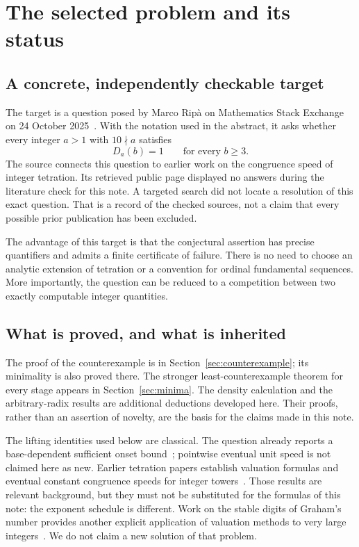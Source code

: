 \documentclass[11pt,a4paper]{article}
\theoremstyle{definition}
\begin{document}
\section{The selected problem and its status}\label{sec:status}

\subsection{A concrete, independently checkable target}
The target is a question posed by Marco Rip\`a on Mathematics Stack Exchange
on 24 October 2025~\cite{question}. With the notation used in the abstract,
it asks whether every integer $a>1$ with $10\nmid a$ satisfies
\begin{equation}\label{eq:conjecture}
D_a(b)=1\qquad\text{for every }b\ge3.
\end{equation}
The source connects this question to earlier work on the congruence speed
of integer tetration. Its retrieved public page displayed no answers during
the literature check for this note. A targeted search did not locate a
resolution of this exact question. That is a record of the checked sources,
not a claim that every possible prior publication has been excluded.

The advantage of this target is that the conjectural assertion has precise
quantifiers and admits a finite certificate of failure. There is no need to
choose an analytic extension of tetration or a convention for ordinal
fundamental sequences. More importantly, the question can be reduced to a
competition between two exactly computable integer quantities.

\subsection{What is proved, and what is inherited}
The proof of the counterexample is in Section~\ref{sec:counterexample}; its
minimality is also proved there. The stronger least-counterexample theorem
for every stage appears in Section~\ref{sec:minima}. The density calculation
and the arbitrary-radix results are additional deductions developed here.
Their proofs, rather than an assertion of novelty, are the basis for the
claims made in this note.

The lifting identities used below are classical. The question already reports
a base-dependent sufficient onset bound~\cite{question}; pointwise eventual
unit speed is not claimed here as new. Earlier tetration papers
establish valuation formulas and eventual constant congruence speeds for
integer towers~\cite{speed,stable}. Those results are relevant background,
but they must not be substituted for the formulas of this note: the exponent
schedule is different. Work on the stable digits of Graham's number provides
another explicit application of valuation methods to very large
integers~\cite{graham}. We do not claim a new solution of that problem.
\end{document}
